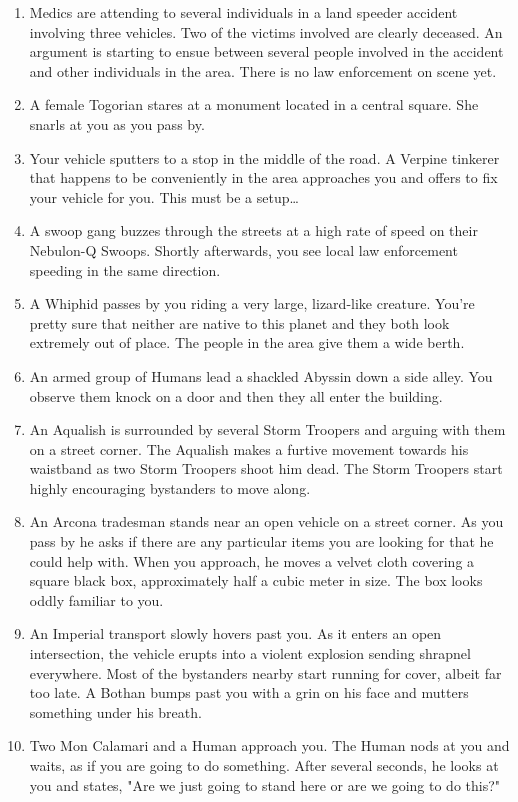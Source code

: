 \documentclass{article}
\begin{document}
\begin{enumerate}
	\item Medics are attending to several individuals in a land speeder accident involving three vehicles. Two of the victims involved are clearly deceased. An argument is starting to ensue between several people involved in the accident and other individuals in the area. There is no law enforcement on scene yet.
	\item A female Togorian stares at a monument located in a central square. She snarls at you as you pass by.
	\item Your vehicle sputters to a stop in the middle of the road. A Verpine tinkerer that happens to be conveniently in the area approaches you and offers to fix your vehicle for you. This must be a setup…
	\item A swoop gang buzzes through the streets at a high rate of speed on their Nebulon-Q Swoops. Shortly afterwards, you see local law enforcement speeding in the same direction.
	\item A Whiphid passes by you riding a very large, lizard-like creature. You’re pretty sure that neither are native to this planet and they both look extremely out of place. The people in the area give them a wide berth.
	\item An armed group of Humans lead a shackled Abyssin down a side alley. You observe them knock on a door and then they all enter the building.
	\item An Aqualish is surrounded by several Storm Troopers and arguing with them on a street corner. The Aqualish makes a furtive movement towards his waistband as two Storm Troopers shoot him dead. The Storm Troopers start highly encouraging bystanders to move along.
	\item An Arcona tradesman stands near an open vehicle on a street corner. As you pass by he asks if there are any particular items you are looking for that he could help with. When you approach, he moves a velvet cloth covering a square black box, approximately half a cubic meter in size. The box looks oddly familiar to you.
	\item An Imperial transport slowly hovers past you. As it enters an open intersection, the vehicle erupts into a violent explosion sending shrapnel everywhere. Most of the bystanders nearby start running for cover, albeit far too late. A Bothan bumps past you with a grin on his face and mutters something under his breath.
	\item Two Mon Calamari and a Human approach you. The Human nods at you and waits, as if you are going to do something. After several seconds, he looks at you and states, "Are we just going to stand here or are we going to do this?"
\end{enumerate}
\end{document}
